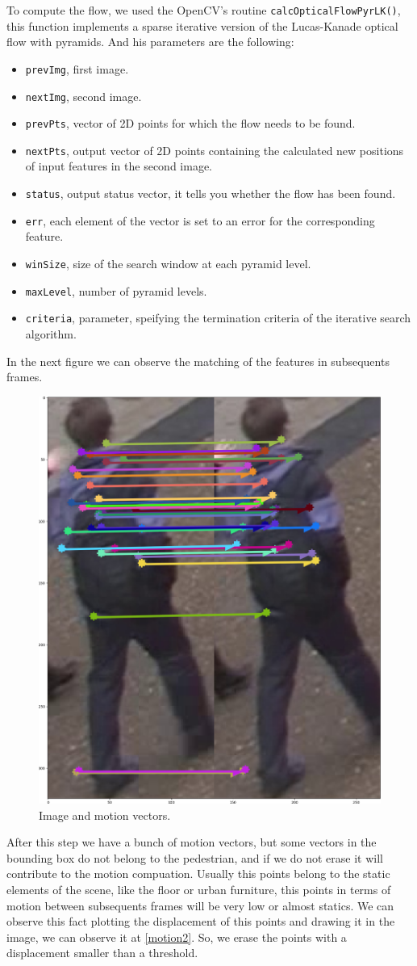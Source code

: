 \documentclass[12pt, a4paper, titlepage,twoside,openright]{article}
\begin{document}
To compute the flow, we used the OpenCV's routine \texttt{calcOpticalFlowPyrLK()}, this function implements a sparse iterative version of the Lucas-Kanade optical flow with pyramids. And his parameters are the following:
 
\begin{itemize}

\item \texttt{prevImg}, first image.
\item \texttt{nextImg}, second image.
\item \texttt{prevPts}, vector of 2D points for which the flow needs to be found. 
\item \texttt{nextPts}, output vector of 2D points containing the calculated new positions of input features in the second image. 
\item \texttt{status}, output status vector, it tells you whether the flow has been found.  
\item \texttt{err}, each element of the vector is set to an error for the corresponding feature.
\item \texttt{winSize}, size of the search window at each pyramid level. 
\item \texttt{maxLevel}, number of pyramid levels.  
\item \texttt{criteria}, parameter, speifying the termination criteria of the iterative search algorithm.
\end{itemize}


In the next figure we can observe the matching of the features in subsequents frames.

\begin{figure}[hptb]
\centering         
\includegraphics[width=0.3\linewidth]{implementation/matching.png}
\caption{Image and motion vectors.} \label{motion1}
\end{figure}


After this step we have a bunch of motion vectors, but some vectors in the bounding box do not belong to the pedestrian, and if we do not erase it will contribute to the motion compuation. Usually this points belong to the static elements of the scene, like the floor or urban furniture, this points in terms of motion between subsequents frames will be very low or almost statics. We can observe this fact plotting the displacement of this points and drawing it in the image, we can observe it at \ref{motion2}. So, we erase the points with a displacement smaller than a threshold. 
\end{document}
